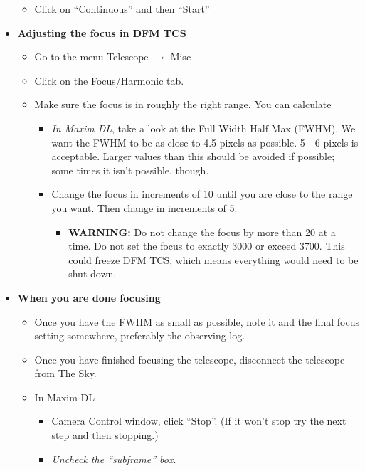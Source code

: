 \documentclass[letterpaper, 12pt]{report}
\begin{document}
\begin{itemize}
\begin{itemize}
\begin{enumerate}
		\end{enumerate}
		\item Click on ``Continuous'' and then ``Start''
	\end{itemize}
	\item {\large \textbf{Adjusting the focus in DFM TCS}}
	\begin{itemize}
		\item Go to the menu Telescope $\rightarrow$ Misc
		\item Click on the Focus/Harmonic tab.
		\item Make sure the focus is in roughly the right range. You can calculate
		\begin{itemize}
			\item \emph{In Maxim DL}, take a look at the Full Width Half Max (FWHM). We want the FWHM to be as close to 4.5 pixels as possible. 5 - 6 pixels is acceptable. Larger values than this should be avoided if possible; some times it isn't possible, though.
			\item Change the focus in increments of 10 until you are close to the range you want. Then change in increments of 5.
			\begin{itemize}
				\item {\large \textbf{WARNING:}} Do not change the focus by more than 20 at a time. Do not set the focus to exactly 3000 or exceed 3700. This could freeze DFM TCS, which means everything would need to be shut down.
			\end{itemize}
		\end{itemize}
	\end{itemize}
	\item {\large \textbf{When you are done focusing}}
	\begin{itemize}
		\item Once you have the FWHM as small as possible, note it and the final focus setting somewhere, preferably the observing log.
		\item Once you have finished focusing the telescope, disconnect the telescope from The Sky.
		\item In Maxim DL
		\begin{itemize}
			\item Camera Control window, click ``Stop''. (If it won't stop try the next step and then stopping.)
			\item \emph{Uncheck the ``subframe'' box}.
		\end{itemize}
	\end{itemize}
\end{itemize}
\end{document}
